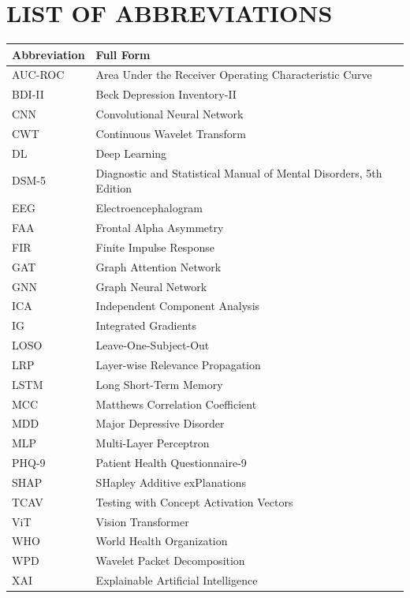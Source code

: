 \documentclass[12pt,a4paper,oneside]{report}
\begin{document}
\listoffigures
{}
\newpage

\listoftables
{}
\newpage

\chapter*{LIST OF ABBREVIATIONS}

\begin{tabular}{@{}ll@{}}
\toprule
\textbf{Abbreviation} & \textbf{Full Form} \\
\midrule
AUC-ROC & Area Under the Receiver Operating Characteristic Curve \\
BDI-II & Beck Depression Inventory-II \\
CNN & Convolutional Neural Network \\
CWT & Continuous Wavelet Transform \\
DL & Deep Learning \\
DSM-5 & Diagnostic and Statistical Manual of Mental Disorders, 5th Edition \\
EEG & Electroencephalogram \\
FAA & Frontal Alpha Asymmetry \\
FIR & Finite Impulse Response \\
GAT & Graph Attention Network \\
GNN & Graph Neural Network \\
ICA & Independent Component Analysis \\
IG & Integrated Gradients \\
LOSO & Leave-One-Subject-Out \\
LRP & Layer-wise Relevance Propagation \\
LSTM & Long Short-Term Memory \\
MCC & Matthews Correlation Coefficient \\
MDD & Major Depressive Disorder \\
MLP & Multi-Layer Perceptron \\
PHQ-9 & Patient Health Questionnaire-9 \\
SHAP & SHapley Additive exPlanations \\
TCAV & Testing with Concept Activation Vectors \\
ViT & Vision Transformer \\
WHO & World Health Organization \\
WPD & Wavelet Packet Decomposition \\
XAI & Explainable Artificial Intelligence \\
\bottomrule
\end{tabular}
\end{document}
